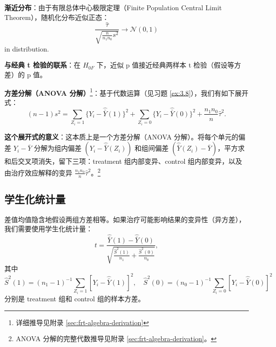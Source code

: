 \textbf{渐近分布}：由于有限总体中心极限定理（Finite Population Central Limit Theorem），随机化分布近似正态：
\begin{equation}
\frac{\hat{\tau}}{\sqrt{\frac{n}{n_1 n_0} s^2}} \rightarrow \mathcal{N}(0,1)
\label{eq:frt-tau-hat-asymptotic}
\end{equation}
in distribution.

\textbf{与经典 t 检验的联系}：在 $H_{0F}$ 下，近似 p 值接近经典两样本 t 检验（假设等方差）的 p 值。

\textbf{方差分解（ANOVA 分解）}\footnote{详细推导见附录 \cref{sec:frt-algebra-derivation}}：基于代数运算（见习题 \ref{ex:3.8}），我们有如下展开式：
\begin{equation}
(n-1)s^2 = \sum_{Z_i=1} \{Y_i - \hat{\bar{Y}}(1)\}^2 + \sum_{Z_i=0} \{Y_i - \hat{\bar{Y}}(0)\}^2 + \frac{n_1 n_0}{n} \hat{\tau}^2 .
\label{eq:frt-algebra}
\end{equation}

\textbf{这个展开式的意义}：这本质上是一个方差分解（ANOVA 分解）。将每个单元的偏差 $Y_i - \bar{Y}$ 分解为组内偏差 $(Y_i - \hat{\bar{Y}}(Z_i))$ 和组间偏差 $(\hat{\bar{Y}}(Z_i) - \bar{Y})$，平方求和后交叉项消失，留下三项：treatment 组内部变异、control 组内部变异，以及由治疗效应解释的变异 $\frac{n_1 n_0}{n} \hat{\tau}^2$。\footnote{ANOVA 分解的完整代数推导见附录 \cref{sec:frt-algebra-derivation}。}


\subsection{学生化统计量}

差值均值隐含地假设两组方差相等。如果治疗可能影响结果的变异性（异方差），我们需要使用学生化统计量：
\begin{equation}
t = \frac{\hat{\bar{Y}}(1) - \hat{\bar{Y}}(0)}{\sqrt{\frac{\hat{S}^2(1)}{n_1} + \frac{\hat{S}^2(0)}{n_0}}},
\label{eq:studentized-statistic}
\end{equation}
其中
\begin{equation}
\hat{S}^2(1) = (n_1 - 1)^{-1} \sum_{Z_i =1} [Y_i -\hat{\bar{Y}}(1)]^2,\quad
\hat{S}^2(0) = (n_0 - 1)^{-1} \sum_{Z_i =0} [Y_i -\hat{\bar{Y}}(0)]^2
\label{eq:group-variances}
\end{equation}
分别是 treatment 组和 control 组的样本方差。

